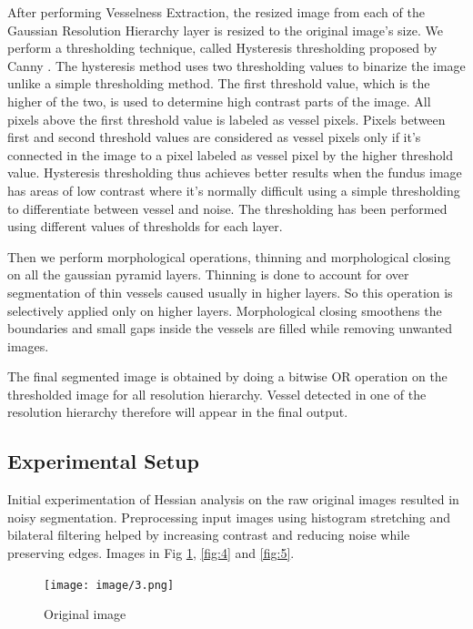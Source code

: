 \documentclass[conference]{IEEEtran}
\begin{document}
\par
After performing Vesselness Extraction, the resized image from each of the Gaussian Resolution Hierarchy layer is resized to the original image’s size. We perform a thresholding technique, called Hysteresis thresholding proposed by Canny \cite{23}. The hysteresis method uses two thresholding values to binarize the image unlike a simple thresholding method. The first threshold value, which is the higher of the two, is used to determine high contrast parts of the image. All pixels above the first threshold value is labeled as vessel pixels. Pixels between first and second threshold values are considered as vessel pixels only if it’s connected in the image to a pixel labeled as vessel pixel by the higher threshold value. Hysteresis thresholding thus achieves better results when the fundus image has areas of low contrast where it’s normally difficult using a simple thresholding to differentiate between vessel and noise. The thresholding has been performed using different values of thresholds for each layer.
\par
Then we perform morphological operations, thinning and morphological closing on all the gaussian pyramid layers. Thinning is done to account for over segmentation of thin vessels caused usually in higher layers. So this operation is selectively applied only on higher layers. Morphological closing smoothens the boundaries and small gaps inside the vessels are filled while removing unwanted images.
\par
The final segmented image is obtained by doing a bitwise OR operation on the thresholded image for all resolution hierarchy. Vessel detected in one of the resolution hierarchy therefore will appear in the final output.

\subsection{Experimental Setup}
\label{ssec:gsetup}
\par

Initial experimentation of Hessian analysis on the raw original images resulted in noisy segmentation. Preprocessing input images using histogram stretching and bilateral filtering helped by increasing contrast and reducing noise while preserving edges. Images in Fig \ref{fig:3}, \ref{fig:4} and \ref{fig:5}.
\par

\begin{figure}[H]
	\centering
	\texttt{[image: image/3.png]}
	\caption{Original image}
	\label{fig:3}
\end{figure}
\end{document}
